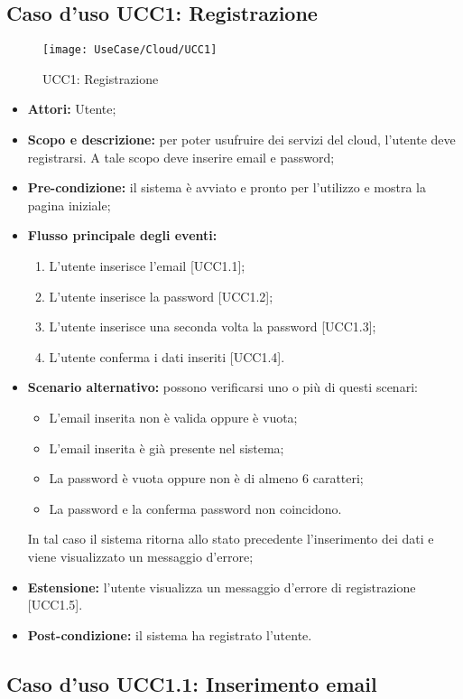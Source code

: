 \subsection{Caso d'uso UCC1: Registrazione}

\begin{figure}[H]
\centering
\texttt{[image: UseCase/Cloud/UCC1]}
\caption{UCC1: Registrazione}
\end{figure}

\begin{itemize}
\item \textbf{Attori:} Utente;
\item \textbf{Scopo e descrizione:} per poter usufruire dei servizi del cloud, l'utente deve registrarsi. A tale scopo deve inserire email e password;
\item \textbf{Pre-condizione:} il sistema è avviato e pronto per l'utilizzo e mostra la pagina iniziale; 
\item \textbf{Flusso principale degli eventi:}
\begin{enumerate}
\item L’utente inserisce l’email [UCC1.1];
\item L’utente inserisce la password [UCC1.2];
\item L’utente inserisce una seconda volta la password [UCC1.3];
\item L'utente conferma i dati inseriti [UCC1.4].
\end{enumerate}
\item \textbf{Scenario alternativo:}	possono verificarsi uno o più di questi scenari:
\begin{itemize}
\item L'email inserita non è valida oppure è vuota;
\item L'email inserita è già presente nel sistema;
\item La password è vuota oppure non è di almeno 6 caratteri;
\item La password e la conferma password non coincidono.
\end{itemize}
In tal caso il sistema ritorna allo stato precedente l'inserimento dei dati e viene visualizzato un messaggio d'errore;
\item \textbf{Estensione:} l'utente visualizza un messaggio d'errore di registrazione [UCC1.5].
\item \textbf{Post-condizione:} il sistema ha registrato l'utente.
\end{itemize}

\subsection{Caso d'uso UCC1.1: Inserimento email}

